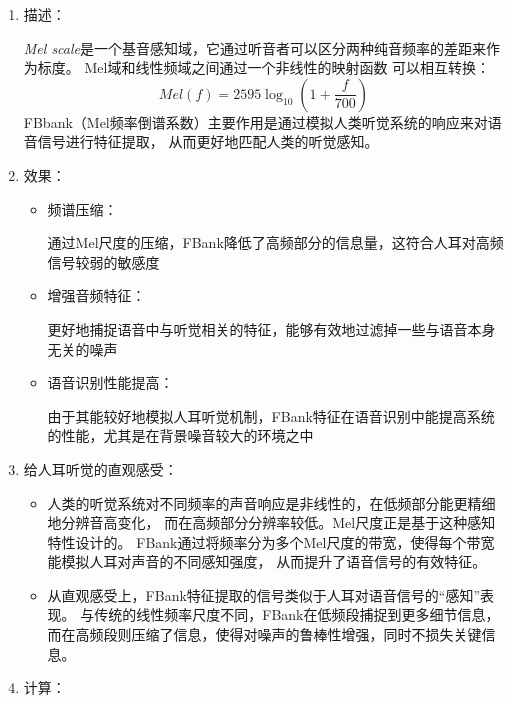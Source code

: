 \documentclass[a4paper]{article}
\begin{document}
\begin{enumerate}
  \item 
  {
    描述：

    \emph{Mel scale}是一个基音感知域，它通过听音者可以区分两种纯音频率的差距来作为标度。
    Mel域和线性频域之间通过一个非线性的映射函数
    可以相互转换：
    \begin{equation}
      Mel(f) = 2595\log_{10}(1 + \frac{f}{700})
      \label{eq:Mel Domain}
    \end{equation}
    FBbank（Mel频率倒谱系数）主要作用是通过模拟人类听觉系统的响应来对语音信号进行特征提取，
    从而更好地匹配人类的听觉感知。
  }
  \item 
  {
    效果：
    \begin{itemize}
      \item 频谱压缩：
      
      通过Mel尺度的压缩，FBank降低了高频部分的信息量，这符合人耳对高频信号较弱的敏感度
      \item 增强音频特征：
      
      更好地捕捉语音中与听觉相关的特征，能够有效地过滤掉一些与语音本身无关的噪声
      \item 语音识别性能提高：
      
      由于其能较好地模拟人耳听觉机制，FBank特征在语音识别中能提高系统的性能，尤其是在背景噪音较大的环境之中
    \end{itemize}
  }
  \item 
  {
    给人耳听觉的直观感受：
    \begin{itemize}
      \item 人类的听觉系统对不同频率的声音响应是非线性的，在低频部分能更精细地分辨音高变化，
      而在高频部分分辨率较低。Mel尺度正是基于这种感知特性设计的。
      FBank通过将频率分为多个Mel尺度的带宽，使得每个带宽能模拟人耳对声音的不同感知强度，
      从而提升了语音信号的有效特征。
      \item 从直观感受上，FBank特征提取的信号类似于人耳对语音信号的“感知”表现。
      与传统的线性频率尺度不同，FBank在低频段捕捉到更多细节信息，
      而在高频段则压缩了信息，使得对噪声的鲁棒性增强，同时不损失关键信息。
    \end{itemize}
  }
  \item 
  {
    计算：

}
\end{enumerate}
\end{document}
